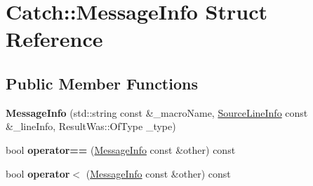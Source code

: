 \hypertarget{structCatch_1_1MessageInfo}{
\section{Catch::MessageInfo Struct Reference}
\label{structCatch_1_1MessageInfo}
}
\subsection*{Public Member Functions}
\begin{DoxyCompactItemize}
\item 
\hypertarget{structCatch_1_1MessageInfo_a2e336c33ebef7af3c1bbae6a56e14f8a}{
{\bfseries MessageInfo} (std::string const \&\_\-macroName, \hyperlink{structCatch_1_1SourceLineInfo}{SourceLineInfo} const \&\_\-lineInfo, ResultWas::OfType \_\-type)}
\label{structCatch_1_1MessageInfo_a2e336c33ebef7af3c1bbae6a56e14f8a}

\item 
\hypertarget{structCatch_1_1MessageInfo_a30fe117138e568c5a9dfdabb7de6e790}{
bool {\bfseries operator==} (\hyperlink{structCatch_1_1MessageInfo}{MessageInfo} const \&other) const }
\label{structCatch_1_1MessageInfo_a30fe117138e568c5a9dfdabb7de6e790}

\item 
\hypertarget{structCatch_1_1MessageInfo_a7a2b1ec3772cd35176e2ee25a94be16a}{
bool {\bfseries operator$<$} (\hyperlink{structCatch_1_1MessageInfo}{MessageInfo} const \&other) const }
\label{structCatch_1_1MessageInfo_a7a2b1ec3772cd35176e2ee25a94be16a}

\end{DoxyCompactItemize}
